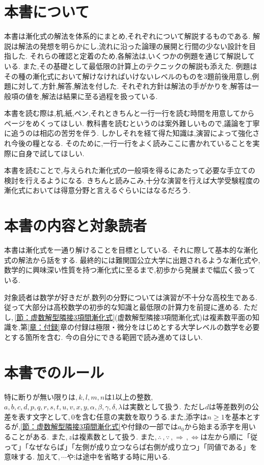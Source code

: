 \section{本書について}
  本書は漸化式の解法を体系的にまとめ,それぞれについて解説するものである.
  解説は解法の発想を明らかにし,流れに沿った論理の展開と行間の少ない設計を目指した.
  それらの確認と定着のため,各解法は,いくつかの例題を通じて解説している.
  また,その基礎として最低限の計算上のテクニックの解説も添えた.
  例題はその種の漸化式において解けなければいけないレベルのものを3題前後用意し,例題に対して,方針,解答,解法を付した.
  それぞれ方針は解法の手がかりを,解答は一般項の値を,解法は結果に至る過程を扱っている.

  本書を読む際は,机,紙,ペン,それときちんと一行一行を読む時間を用意してからページをめくってほしい.
  教科書を読むというのは案外難しいもので,議論を丁寧に追うのは相応の苦労を伴う.
  しかしそれを経て得た知識は,演習によって強化され今後の糧となる.
  そのために,一行一行をよく読みここに書かれていることを実際に自身で試してほしい.

  本書を読むことで,与えられた漸化式の一般項を得るにあたって必要な手立ての検討を行えるようになる.
  きちんと読みこみ,十分な演習を行えば大学受験程度の漸化式においては得意分野と言えるぐらいにはなるだろう.     

\section{本書の内容と対象読者}
  本書は漸化式を一通り解けることを目標としている.
  それに際して基本的な漸化式の解法から話をする.
  最終的には難関国公立大学に出題されるような漸化式や,数学的に興味深い性質を持つ漸化式に至るまで,初歩から発展まで幅広く扱っている.
  
  対象読者は数学が好きだが,数列の分野については演習が不十分な高校生である.
  従って大部分は高校数学の初歩的な知識と最低限の計算力を前提に進める.
  ただし,\,\ref{節：虚数解型隣接3項間漸化式}(虚数解型隣接3項間漸化式)は複素数平面の知識を,第\ref{章：付録}章の付録は極限・微分をはじめとする大学レベルの数学を必要とする箇所を含む.
  今の自分にできる範囲で読み進めてほしい.

\section{本書でのルール}
  特に断りが無い限りは,\,$k,l,m,n$は1以上の整数,\,$a,b,c,d,p,q,r,s,t,u,v,x,y,\alpha,\beta,\gamma,\delta,\lambda$は実数として扱う.
  ただし$d$は等差数列の公差を表す文字として,\,$0$を含む任意の実数を取りうる.また,添字は$n\ge1$を基本とするが,\ref{節：虚数解型隣接3項間漸化式}や付録の一部では$a_0$から始まる添字を用いることがある.
  また,\,$z$は複素数として扱う.
  また,\,$\therefore\,,\because\,,\Rightarrow\,,\Leftrightarrow$は左から順に「従って」「なぜならば」「左側が成り立つならば右側が成り立つ」「同値である」を意味する.
  加えて,\,$\cdots$や$\vdots$は途中を省略する時に用いる.
  
